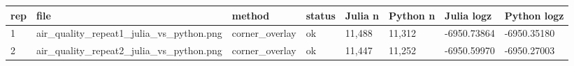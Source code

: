 \begin{tabular}{llllllll}
\toprule
rep & file & method & status & Julia n & Python n & Julia logz & Python logz \\
\midrule
1 & air\_quality\_repeat1\_julia\_vs\_python.png & corner\_overlay & ok & 11,488 & 11,312 & -6950.73864 & -6950.35180 \\
2 & air\_quality\_repeat2\_julia\_vs\_python.png & corner\_overlay & ok & 11,447 & 11,252 & -6950.59970 & -6950.27003 \\
\bottomrule
\end{tabular}

